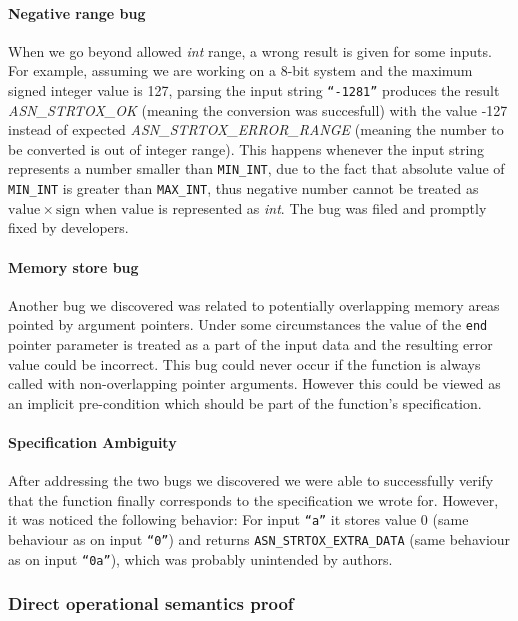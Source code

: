 \documentclass[acmsmall,nonacm]{acmart}
\begin{document}
\paragraph{Negative range bug}

When we go beyond allowed \textit{int} range, a wrong result is given
for some inputs. For example, assuming we are working on a 8-bit
system and the maximum signed integer value is 127, parsing the input
string \texttt{``-1281''} produces the result
\emph{ASN\_STRTOX\_OK} (meaning the conversion was succesfull) with the value -127 instead of expected
\emph{ASN\_STRTOX\_ERROR\_RANGE} (meaning the number to be converted is out of integer range). This happens whenever the input
string represents a number smaller than \texttt{MIN\_INT}, due to the
fact that absolute value of \texttt{MIN\_INT} is greater than
\texttt{MAX\_INT}, thus negative number cannot be treated as
$\mathrm{value}\times\mathrm{sign}$ when $\mathrm{value}$ is
represented as \textit{int}. The bug was filed and promptly fixed by
developers.

\paragraph{Memory store bug}

Another bug we discovered was related to potentially overlapping
memory areas pointed by argument pointers. Under some circumstances
the value of the \texttt{end} pointer parameter is treated as a part
of the input data and the resulting error value could be
incorrect. This bug could never occur if the function is always called
with non-overlapping pointer arguments. However this could be viewed
as an implicit pre-condition which should be part of the function's
specification.

\paragraph{Specification Ambiguity}

After addressing the two bugs we discovered we were able to
successfully verify that the function finally corresponds to the
specification we wrote for. However, it was noticed the following
behavior: For input \texttt{``a''} it stores value 0 (same behaviour as on input \texttt{``0''}) and returns
{\color{green}\texttt{ASN\_STRTOX\_EXTRA\_DATA}} (same behaviour as on
input \texttt{``0a''}), which was probably unintended by authors.
  
\subsubsection{Direct operational semantics proof}
\end{document}
